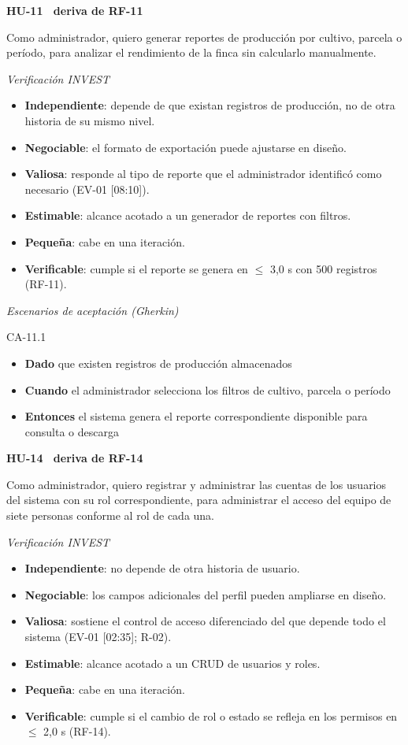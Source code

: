 \documentclass[12pt,a4paper]{article}
\begin{document}
\bigskip
\noindent\textbf{HU-11 \textperiodcentered\ deriva de RF-11}

\smallskip
\noindent Como administrador, quiero generar reportes de producción por cultivo, parcela o período, para analizar el rendimiento de la finca sin calcularlo manualmente.

\smallskip
\noindent\textit{Verificación INVEST}
\begin{itemize}
\item \textbf{Independiente}: depende de que existan registros de producción, no de otra historia de su mismo nivel.
\item \textbf{Negociable}: el formato de exportación puede ajustarse en diseño.
\item \textbf{Valiosa}: responde al tipo de reporte que el administrador identificó como necesario (EV-01 [08:10]).
\item \textbf{Estimable}: alcance acotado a un generador de reportes con filtros.
\item \textbf{Pequeña}: cabe en una iteración.
\item \textbf{Verificable}: cumple si el reporte se genera en $\leq$ 3,0 s con 500 registros (RF-11).
\end{itemize}

\smallskip
\noindent\textit{Escenarios de aceptación (Gherkin)}

\noindent CA-11.1
\begin{itemize}
\item[] \textbf{Dado} que existen registros de producción almacenados
\item[] \textbf{Cuando} el administrador selecciona los filtros de cultivo, parcela o período
\item[] \textbf{Entonces} el sistema genera el reporte correspondiente disponible para consulta o descarga
\end{itemize}

\bigskip
\noindent\textbf{HU-14 \textperiodcentered\ deriva de RF-14}

\smallskip
\noindent Como administrador, quiero registrar y administrar las cuentas de los usuarios del sistema con su rol correspondiente, para administrar el acceso del equipo de siete personas conforme al rol de cada una.

\smallskip
\noindent\textit{Verificación INVEST}
\begin{itemize}
\item \textbf{Independiente}: no depende de otra historia de usuario.
\item \textbf{Negociable}: los campos adicionales del perfil pueden ampliarse en diseño.
\item \textbf{Valiosa}: sostiene el control de acceso diferenciado del que depende todo el sistema (EV-01 [02:35]; R-02).
\item \textbf{Estimable}: alcance acotado a un CRUD de usuarios y roles.
\item \textbf{Pequeña}: cabe en una iteración.
\item \textbf{Verificable}: cumple si el cambio de rol o estado se refleja en los permisos en $\leq$ 2,0 s (RF-14).
\end{itemize}
\end{document}
